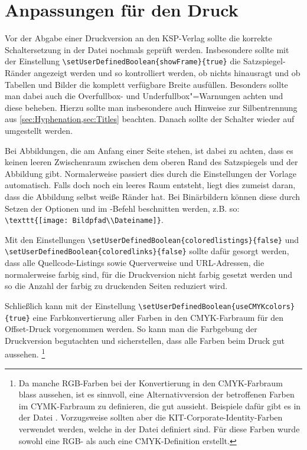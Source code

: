\section[Anpassungen für den Druck]{Anpassungen für den Druck}%
%
\label{sec:Druckanpassungen}
%
Vor der Abgabe einer Druckversion an den KSP-Verlag sollte die korrekte Schaltersetzung in der Datei  nochmals geprüft werden.
Insbesondere sollte mit der Einstellung
\lstinline|\setUserDefinedBoolean{showFrame}{true}|
die Satzspiegel-Ränder angezeigt werden und so kontrolliert werden,
ob nichts hinausragt und ob Tabellen und Bilder die komplett verfügbare Breite ausfüllen.
Besonders sollte man dabei auch die Overfullbox- und Underfullbox"=Warnungen achten und diese beheben.
Hierzu sollte man insbesondere auch Hinweise zur Silbentrennung aus
\cref{sec:Hyphenation,sec:Titles} beachten.
Danach sollte der Schalter wieder auf  umgestellt werden.

Bei Abbildungen, die am Anfang einer Seite stehen, ist dabei zu achten,
dass es keinen leeren Zwischenraum zwischen dem oberen Rand des Satzspiegels und der Abbildung gibt.
Normalerweise passiert dies durch die Einstellungen der Vorlage automatisch.
Falls doch noch ein leeres Raum entsteht, liegt dies zumeist daran, dass die Abbildung selbst weiße Ränder hat.
Bei Binärbildern können diese durch Setzen der Optionen
 und 
im -Befehl beschnitten werden, z.B. so:
\lstinline|\texttt{[image: Bildpfad\\Dateiname]}|.

Mit den Einstellungen 
\lstinline|\setUserDefinedBoolean{coloredlistings}{false}| und 
\lstinline|\setUserDefinedBoolean{coloredlinks}{false}|
sollte dafür gesorgt werden, dass alle Quellcode-Listings sowie Querverweise und URL-Adressen,
die normalerweise farbig sind, für die Druckversion nicht farbig gesetzt werden
und so die Anzahl der farbig zu druckenden Seiten reduziert wird.

Schließlich kann mit der Einstellung
\lstinline|\setUserDefinedBoolean{useCMYKcolors}{true}|
eine Farbkonvertierung aller Farben in den CMYK-Farbraum für den Offset-Druck vorgenommen werden.
So kann man die Farbgebung der Druckversion begutachten und sicherstellen, dass alle Farben beim Druck gut aussehen.%
\footnote{Da manche RGB-Farben bei der Konvertierung in den CMYK-Farbraum blass aussehen,
ist es sinnvoll, eine Alternativversion der betroffenen Farben im CYMK-Farbraum zu definieren,
die gut aussieht.
Beispiele dafür gibt es in der Datei .
Vorzugsweise sollten aber die KIT-Corporate-Identity-Farben verwendet werden,
welche in der Datei  definiert sind.
Für diese Farben wurde sowohl eine RGB- als auch eine CMYK-Definition erstellt.}